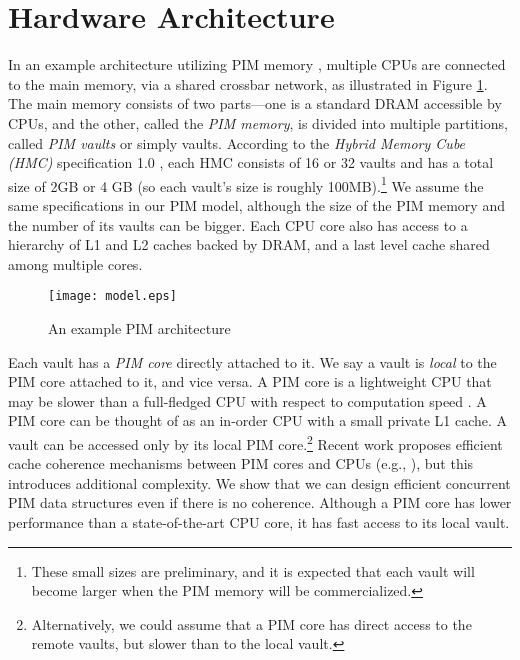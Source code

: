 \section{Hardware Architecture}


\label{section:hardware_model}

In an example architecture utilizing PIM memory \cite{Ahn2015:2, Zhang2014:TTP, Ahn2015:1, boroumand2016}, 
multiple CPUs are connected to the main
memory, via a shared crossbar network, as illustrated in Figure \ref{figure:model}.
The main memory consists of two parts---one is a standard DRAM accessible by CPUs, 
and the other, called the \textit{PIM memory}, is divided into multiple partitions, 
called \textit{PIM vaults} or simply vaults.  
According to the \textit{Hybrid Memory Cube (HMC)} specification 1.0 \cite{website:HMC}, 
each HMC consists of 16 or 
32 vaults and has a total size of 2GB or 4 GB (so each vault's size is roughly 100MB).\footnote{
These small sizes are preliminary, and it is expected that each vault will become larger when the 
PIM memory will be commercialized.} 
We assume the same specifications in our PIM model, although the size of the PIM memory and 
the number of its vaults can be bigger. 
Each CPU core also has access to a hierarchy of L1 and L2 caches backed by DRAM,
and a last level cache shared among multiple cores. 

\begin{figure}[ht!]
\centering
\texttt{[image: model.eps]}
\caption{An example PIM architecture}
\label{figure:model}
\end{figure}

Each vault has a \textit{PIM core} directly attached to it.
We say a vault is \textit{local} to the PIM core attached to it, and vice versa.
A PIM core is a lightweight CPU that may be slower than a full-fledged CPU
with respect to computation speed \cite{Ahn2015:2}. 
A PIM core can be thought of as an in-order CPU with a small private L1 cache.
A vault can be accessed only by its local PIM core.\footnote{
Alternatively, we could assume that a PIM core has direct access to the remote vaults, but slower than to the local vault.}
Recent work proposes efficient cache coherence mechanisms between PIM cores and CPUs  
(e.g., \cite{boroumand2016, Ahn2015:1}), but this introduces additional complexity. 
We show that we can design efficient concurrent PIM data structures even if there is no coherence.
Although a PIM core has lower performance than a state-of-the-art CPU core, 
it has fast access to its local vault.

